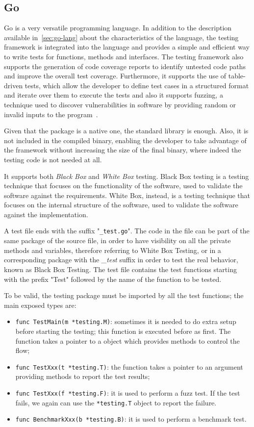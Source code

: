 \subsection{Go}

Go is a very versatile programming language. In addition to the description available in~\cref{sec:go-lang} about the characteristics of the language, the testing framework is integrated into the language and provides a simple and efficient way to write tests for functions, methods and interfaces. The testing framework also supports the generation of code coverage reports to identify untested code paths and improve the overall test coverage. Furthermore, it supports the use of table-driven tests, which allow the developer to define test cases in a structured format and iterate over them to execute the tests and also it supports fuzzing, a technique used to discover vulnerabilities in software by providing random or invalid inputs to the program~\cite{go-package-testing}.

Given that the package is a native one, the standard library is enough. Also, it is not included in the compiled binary, enabling the developer to take advantage of the framework without increasing the size of the final binary, where indeed the testing code is not needed at all.

It supports both \textit{Black Box} and \textit{White Box} testing. Black Box testing is a testing technique that focuses on the functionality of the software, used to validate the software against the requirements. White Box, instead, is a testing technique that focuses on the internal structure of the software, used to validate the software against the implementation.

A test file ends with the suffix "\texttt{\_test.go}". The code in the file can be part of the same package of the source file, in order to have visibility on all the private methods and variables, therefore referring to White Box Testing, or in a corresponding package with the \textit{\_test} suffix in order to test the real behavior, known as Black Box Testing. The test file contains the test functions starting with the prefix "Test" followed by the name of the function to be tested.

To be valid, the testing package must be imported by all the test functions; the main exposed types are:
\begin{itemize}
  \item \texttt{func TestMain(m *testing.M)}: sometimes it is needed to do extra setup before starting the testing; this function is executed before as first. The function takes a pointer to a object which provides methods to control the flow;
  \item \texttt{func TestXxx(t *testing.T)}: the function takes a pointer to an argument providing methods to report the test results;
  \item \texttt{func TestXxx(f *testing.F)}: it is used to perform a fuzz test. If the test fails, we again can use the \texttt{*testing.T} object to report the failure.
  \item \texttt{func BenchmarkXxx(b *testing.B)}: it is used to perform a benchmark test.
\end{itemize}

